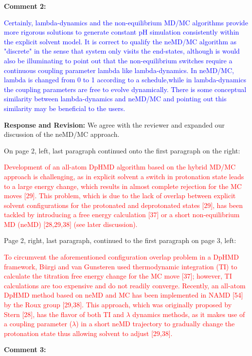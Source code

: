 \documentclass[11pt,letterpaper]{businessletter}
\begin{document}
\begin{letter}
\textbf{Comment 2:}

\textcolor{Blue}{
Certainly, lambda-dynamics and the non-equilibrium MD/MC algorithms provide more rigorous solutions to generate constant pH simulation consistently within the explicit solvent model. It is correct to qualify the neMD/MC algorithm as "discrete" in the sense that system only visits the end-states, although is would also be illuminating to point out that the non-equilibrium switches require a continuous coupling parameter lambda like lambda-dynamics. In neMD/MC, lambda is changed from 0 to 1 according to a schedule,while in lambda-dynamics the coupling parameters are free to evolve dynamically. There is some conceptual similarity between lambda-dynamics and neMD/MC and pointing out this similarity may be beneficial to the users.
}

\textbf{Response and Revision:} 
We agree with the reviewer and expanded our discussion 
of the neMD/MC approach. 

On page 2, left, last paragraph continued onto the first paragraph on the right:

\textcolor{red}{
Development of an all-atom DpHMD algorithm based on the
hybrid MD/MC approach is challenging, 
as in explicit solvent a switch in protonation state
leads to a large energy change, which results in
almost complete rejection for the MC moves [29].
This problem, which is due to the lack of overlap between explicit solvent
configurations for the protonated and deprotonated states [29],
has been tackled by introducing a free energy calculation [37]
or a short non-equilibrium MD (neMD) [28,29,38]
(see later discussion).
}

Page 2, right, last paragraph, continued to the first paragraph 
on page 3, left:

\textcolor{red}{
To circumvent the aforementioned configuration overlap problem
in a DpHMD framework, B\"{u}rgi and van Gunsteren used thermodynamic integration (TI)
to calculate the titration free energy change for the MC move [37];
however, TI calculations are too expensive
and do not readily converge.
Recently, an all-atom DpHMD method based on neMD and MC
has been implemented in NAMD [54] 
by the Roux group [29,38].
This approach, which was originally proposed by Stern [28],
has the flavor of both TI and $\lambda$ dynamics
methods, as it makes use of a coupling parameter ($\lambda$) in
a short neMD trajectory to gradually change the protonation 
state thus allowing solvent to adjust [29,38].
}

\textbf{Comment 3:}


\end{letter}
\end{document}
